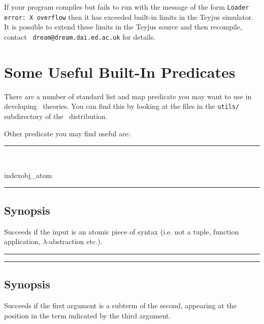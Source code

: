 If your program compiles but fails to run with the message of the form
{\tt Loader error: X overflow} then it has exceeded
built-in limits in the Teyjus simulator.  It is possible to extend
these limits in the Teyjus source and then recompile, contact {\tt
  dream@dream.dai.ed.ac.uk} for details.

\section{Some Useful Built-In Predicates}
There are a number of standard list and map predicate you may want to
use in developing \lclam\ theories.  You can find this by looking at
the files in the {\tt utils/} subdirectory of the \lclam\
distribution.

Other predicate you may find useful are:

\hrule
\vspace{2mm}
\begin{Large}
\
\end{Large}index{obj\_atom}
\vspace{2mm}
\hrule
\vspace{2mm}


\subsection*{Synopsis}
Succeeds if the input is an atomic piece of syntax (i.e. not a
tuple\index{tuple}, function application,
$\lambda$-abstraction\index{$\lambda$-abstraction} etc.).

\vspace{2mm}
\hrule
\vspace{2mm}
\begin{Large}
\end{Large}
\vspace{2mm}
\hrule
\vspace{2mm}


\subsection*{Synopsis}
Succeeds if the first argument is a subterm of the second, appearing
at the position in the term indicated by the third argument.

